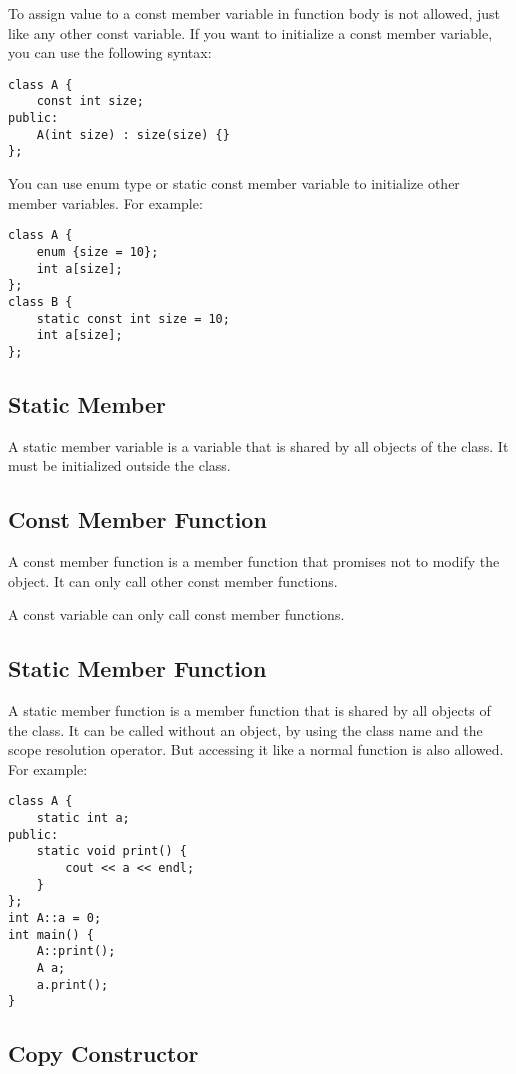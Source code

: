 \documentclass[a4paper,12pt]{article}
\begin{document}
To assign value to a const member variable in function body is not allowed, just like any other const variable.
If you want to initialize a const member variable, you can use the following syntax:
\begin{verbatim}
class A {
    const int size;
public:
    A(int size) : size(size) {}
};
\end{verbatim}

You can use enum type or static const member variable to initialize other member variables.
For example:
\begin{verbatim}
class A {
    enum {size = 10};
    int a[size];
};
class B {
    static const int size = 10;
    int a[size];
};
\end{verbatim}

\subsection{Static Member}

A static member variable is a variable that is shared by all objects of the class.
It must be initialized outside the class.

\subsection{Const Member Function}

A const member function is a member function that promises not to modify the object.
It can only call other const member functions.

A const variable can only call const member functions.

\subsection{Static Member Function}

A static member function is a member function that is shared by all objects of the class.
It can be called without an object, by using the class name and the scope resolution operator.
But accessing it like a normal function is also allowed.
For example:
\begin{verbatim}
class A {
    static int a;
public:
    static void print() {
        cout << a << endl;
    }
};
int A::a = 0;
int main() {
    A::print();
    A a;
    a.print();
}
\end{verbatim}

\subsection{Copy Constructor}
\end{document}
